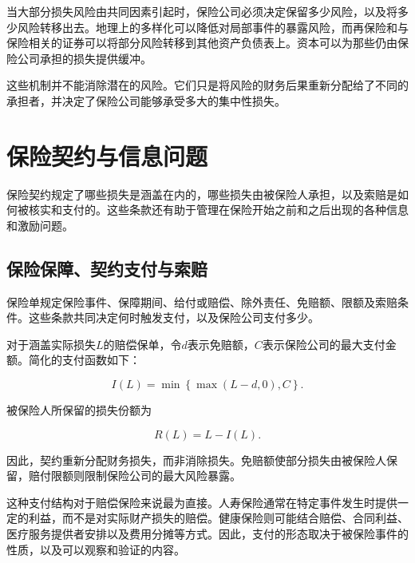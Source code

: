 \begin{tcolorbox}[
enhanced,
breakable,
colback=white,
colframe=FinanceBlue,
boxrule=0.7pt,
sharp corners,
borderline west={2.2pt}{0pt}{FinanceBlue},
title=\textbf{财务展望：当资源整合仍不足以解决问题时},
coltitle=white,
colbacktitle=FinanceBlue,
fonttitle=\bfseries,
before skip=1.2em,
after skip=1.2em
]

当大部分损失风险由共同因素引起时，保险公司必须决定保留多少风险，以及将多少风险转移出去。地理上的多样化可以降低对局部事件的暴露风险，而再保险和与保险相关的证券可以将部分风险转移到其他资产负债表上。资本可以为那些仍由保险公司承担的损失提供缓冲。

这些机制并不能消除潜在的风险。它们只是将风险的财务后果重新分配给了不同的承担者，并决定了保险公司能够承受多大的集中性损失。

\end{tcolorbox}


\section{保险契约与信息问题}

保险契约规定了哪些损失是涵盖在内的，哪些损失由被保险人承担，以及索赔是如何被核实和支付的。这些条款还有助于管理在保险开始之前和之后出现的各种信息和激励问题。


\subsection{保险保障、契约支付与索赔}

保险单规定保险事件、保障期间、给付或赔偿、除外责任、免赔额、限额及索赔条件。这些条款共同决定何时触发支付，以及保险公司支付多少。

对于涵盖实际损失$L$的赔偿保单，令$d$表示免赔额，$C$表示保险公司的最大支付金额。简化的支付函数如下：

\begin{equation}
I(L)=\min\left\{\max(L-d,0), C\right\}.
\label{eq:ch15-insurance-payoff}
\end{equation}

被保险人所保留的损失份额为

\begin{equation}
R(L)=L-I(L).
\label{eq:ch15-retained-loss}
\end{equation}

因此，契约重新分配财务损失，而非消除损失。免赔额使部分损失由被保险人保留，赔付限额则限制保险公司的最大风险暴露。

这种支付结构对于赔偿保险来说最为直接。人寿保险通常在特定事件发生时提供一定的利益，而不是对实际财产损失的赔偿。健康保险则可能结合赔偿、合同利益、医疗服务提供者安排以及费用分摊等方式。因此，支付的形态取决于被保险事件的性质，以及可以观察和验证的内容。

